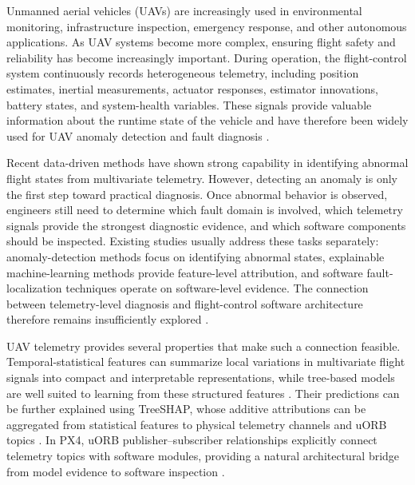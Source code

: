 Unmanned aerial vehicles (UAVs) are increasingly used in environmental monitoring, infrastructure inspection, emergency response, and other autonomous applications. As UAV systems become more complex, ensuring flight safety and reliability has become increasingly important. During operation, the flight-control system continuously records heterogeneous telemetry, including position estimates, inertial measurements, actuator responses, estimator innovations, battery states, and system-health variables. These signals provide valuable information about the runtime state of the vehicle and have therefore been widely used for UAV anomaly detection and fault diagnosis \cite{fourlas2021survey,puchalski2022uav,adaika2025fdd,tan2026anomaly,keipour2019automatic,hu2025mtcl,kabaoglu2026uavsead}.

Recent data-driven methods have shown strong capability in identifying abnormal flight states from multivariate telemetry. However, detecting an anomaly is only the first step toward practical diagnosis. Once abnormal behavior is observed, engineers still need to determine which fault domain is involved, which telemetry signals provide the strongest diagnostic evidence, and which software components should be inspected. Existing studies usually address these tasks separately: anomaly-detection methods focus on identifying abnormal states, explainable machine-learning methods provide feature-level attribution, and software fault-localization techniques operate on software-level evidence. The connection between telemetry-level diagnosis and flight-control software architecture therefore remains insufficiently explored \cite{tan2026anomaly,hu2025mtcl,lundberg2017shap,wong2016survey}.

UAV telemetry provides several properties that make such a connection feasible. Temporal-statistical features can summarize local variations in multivariate flight signals into compact and interpretable representations, while tree-based models are well suited to learning from these structured features \cite{wei2026aerotsboost,ke2017lightgbm}. Their predictions can be further explained using TreeSHAP, whose additive attributions can be aggregated from statistical features to physical telemetry channels and uORB topics \cite{lundberg2017shap,lundberg2020trees}. In PX4, uORB publisher--subscriber relationships explicitly connect telemetry topics with software modules, providing a natural architectural bridge from model evidence to software inspection \cite{meier2015px4,px4uorbdocs2026}.

